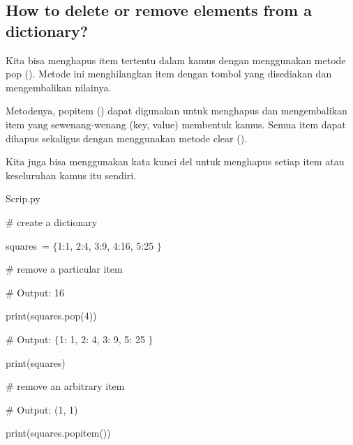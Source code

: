 \subsection*{How to delete or remove elements from a dictionary?}
 \par
\noindent 
Kita bisa menghapus item tertentu dalam kamus dengan menggunakan metode pop (). Metode ini menghilangkan item dengan tombol yang disediakan dan mengembalikan nilainya. \par
\noindent 
Metodenya, popitem () dapat digunakan untuk menghapus dan mengembalikan item yang sewenang-wenang (key, value) membentuk kamus. Semua item dapat dihapus sekaligus dengan menggunakan metode clear (). \par
\noindent 
Kita juga bisa menggunakan kata kunci del untuk menghapus setiap item atau keseluruhan kamus itu sendiri. \par
\vspace{12pt}
\noindent 
Scrip.py \par
\vspace{12pt}
\noindent 
 \hspace*{0.5in}  $  \#  $ create a dictionary \par
\noindent 
 \hspace*{0.5in} squares~=  $  \{  $1:1, 2:4, 3:9, 4:16, 5:25 $  \}  $   \par
\vspace{12pt}
\noindent 
 \hspace*{0.5in}  $  \#  $ remove a particular item \par
\noindent 
 \hspace*{0.5in}  $  \#  $ Output: 16 \par
\noindent 
 \hspace*{0.5in} print(squares.pop(4))~  \par
\vspace{12pt}
\noindent 
 \hspace*{0.5in}  $  \#  $ Output:  $  \{  $1: 1, 2: 4, 3: 9, 5: 25 $  \}  $ \par
\noindent 
 \hspace*{0.5in} print(squares) \par
\vspace{12pt}
\noindent 
 \hspace*{0.5in}  $  \#  $ remove an arbitrary item \par
\noindent 
 \hspace*{0.5in}  $  \#  $ Output: (1, 1) \par
\noindent 
 \hspace*{0.5in} print(squares.popitem()) \par
